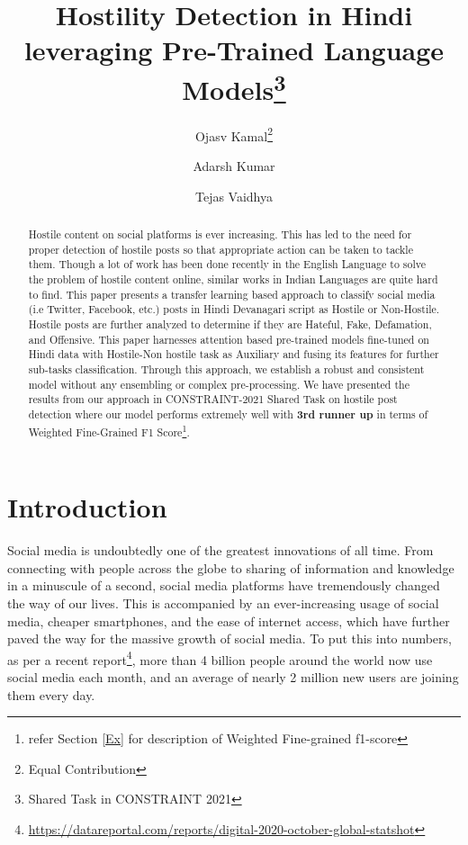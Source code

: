 \documentclass[runningheads]{llncs}
\makeatletter
\newcommand{\printfnsymbol}[1]{\textsuperscript{\@fnsymbol{#1}}}
\makeatother
\begin{document}
\title{Hostility Detection in Hindi leveraging Pre-Trained Language Models\thanks{Shared Task in CONSTRAINT 2021}}
\author{Ojasv Kamal\thanks{Equal Contribution} \and Adarsh Kumar\printfnsymbol{2} \and Tejas Vaidhya}
\maketitle              
\begin{abstract}
Hostile content on social platforms is ever increasing. This has led to the need for proper detection of hostile posts so that appropriate action can be taken to tackle them. Though a lot of work has been done recently in the English Language to solve the problem of hostile content online, similar works in Indian Languages are quite hard to find. This paper presents a transfer learning based approach to classify social media (i.e Twitter, Facebook, etc.) posts in Hindi Devanagari script as Hostile or Non-Hostile. Hostile posts are further analyzed to determine if they are Hateful, Fake, Defamation, and Offensive. This paper harnesses attention based pre-trained models fine-tuned on Hindi data with Hostile-Non hostile task as Auxiliary and fusing its features for further sub-tasks classification. Through this approach, we establish a robust and consistent model without any ensembling or complex pre-processing. We have presented the results from our approach in CONSTRAINT-2021 Shared Task\cite{patwa2021overview} on hostile post detection where our model performs extremely well with\textbf{ 3rd runner up} in terms of Weighted Fine-Grained F1 Score\footnote{refer Section \ref{Ex} for description of Weighted Fine-grained f1-score}.

\end{abstract}
\section{Introduction}
\label{Intro}
Social media is undoubtedly one of the greatest innovations of all time. From connecting with people across the globe to sharing of information and knowledge in a minuscule of a second, social media platforms have tremendously changed the way of our lives. This is accompanied by an ever-increasing usage of social media, cheaper smartphones, and the ease of internet access, which have further paved the way for the massive growth of social media. To put this into numbers, as per a recent report\footnote{\url{https://datareportal.com/reports/digital-2020-october-global-statshot}}, more than 4 billion people around the world now use social media each month, and an average of nearly 2 million new users are joining them every day. \\
\end{document}
